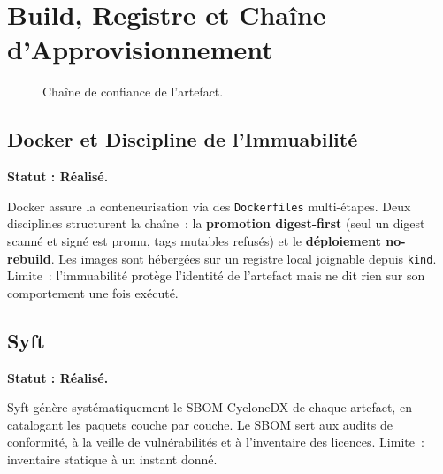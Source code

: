 \section{Build, Registre et Chaîne d'Approvisionnement}

\begin{figure}[htbp]
\centering
\scriptsize
{}
\caption{Chaîne de confiance de l'artefact.}
\label{fig:chaine_confiance}
\end{figure}

\subsection{Docker et Discipline de l'Immuabilité}
\textbf{Statut : Réalisé.}

Docker assure la conteneurisation via des \texttt{Dockerfiles} multi-étapes. Deux disciplines structurent la chaîne~: la \textbf{promotion digest-first} (seul un digest scanné et signé est promu, tags mutables refusés) et le \textbf{déploiement no-rebuild}. Les images sont hébergées sur un registre local joignable depuis \texttt{kind}. Limite~: l'immuabilité protège l'identité de l'artefact mais ne dit rien sur son comportement une fois exécuté.

\subsection{Syft}
\textbf{Statut : Réalisé.}

Syft génère systématiquement le SBOM CycloneDX de chaque artefact, en catalogant les paquets couche par couche. Le SBOM sert aux audits de conformité, à la veille de vulnérabilités et à l'inventaire des licences. Limite~: inventaire statique à un instant donné.

